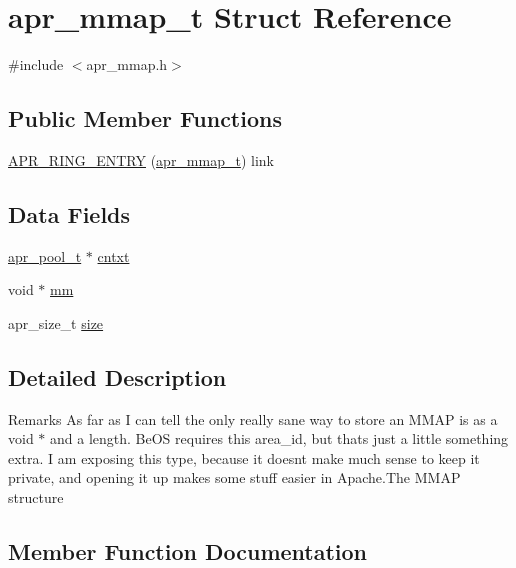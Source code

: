 \hypertarget{structapr__mmap__t}{}\section{apr\+\_\+mmap\+\_\+t Struct Reference}
\label{structapr__mmap__t}


{\ttfamily \#include $<$apr\+\_\+mmap.\+h$>$}

\subsection*{Public Member Functions}
\begin{DoxyCompactItemize}
\item 
\hyperlink{structapr__mmap__t_aeca30aed7539548d31b7c0115020af62}{A\+P\+R\+\_\+\+R\+I\+N\+G\+\_\+\+E\+N\+T\+RY} (\hyperlink{structapr__mmap__t}{apr\+\_\+mmap\+\_\+t}) link
\end{DoxyCompactItemize}
\subsection*{Data Fields}
\begin{DoxyCompactItemize}
\item 
\hyperlink{group__apr__pools_gaf137f28edcf9a086cd6bc36c20d7cdfb}{apr\+\_\+pool\+\_\+t} $\ast$ \hyperlink{structapr__mmap__t_a42d01080278bbc9bad26728f9a71c492}{cntxt}
\item 
void $\ast$ \hyperlink{structapr__mmap__t_abcc62d7e7c8187311e6619faf0d44f19}{mm}
\item 
apr\+\_\+size\+\_\+t \hyperlink{structapr__mmap__t_a274aea0906a4b674e1642ac9e81966c7}{size}
\end{DoxyCompactItemize}


\subsection{Detailed Description}
\begin{DoxyRemark}{Remarks}
As far as I can tell the only really sane way to store an M\+M\+AP is as a void $\ast$ and a length. Be\+OS requires this area\+\_\+id, but that\textquotesingle{}s just a little something extra. I am exposing this type, because it doesn\textquotesingle{}t make much sense to keep it private, and opening it up makes some stuff easier in Apache.\+The M\+M\+AP structure 
\end{DoxyRemark}


\subsection{Member Function Documentation}
